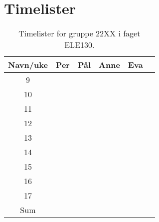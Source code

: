 \documentclass[main.tex]{subfiles}
\begin{document}
\chapter{Timelister}\label{ch:vedlegg_A}

\begin{table}[H]
    \centering
    \caption{Timelister for gruppe 22XX i faget ELE130.}
    \begin{tabular}{|c|c|c|c|c|c|}\hline
        Navn/uke & Per  & Pål
                 & Anne & Eva      \\\hline\hline
        9        &      &     &  & \\\hline
        10       &      &     &  & \\\hline
        11       &      &     &  & \\\hline
        12       &      &     &  & \\\hline
        13       &      &     &  & \\\hline
        14       &      &     &  & \\\hline
        15       &      &     &  & \\\hline
        16       &      &     &  & \\\hline
        17       &      &     &  & \\\hline\hline
        Sum      &      &     &  & \\\hline
    \end{tabular}
    \label{tab:timeliste}
\end{table}
\end{document}
